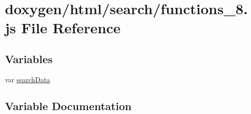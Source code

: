 \hypertarget{a00091}{}\section{doxygen/html/search/functions\+\_\+8.js File Reference}
\label{a00091}
\subsection*{Variables}
\begin{DoxyCompactItemize}
\item 
var \hyperlink{a00091_ad01a7523f103d6242ef9b0451861231e}{search\+Data}
\end{DoxyCompactItemize}


\subsection{Variable Documentation}
\hypertarget{a00091_ad01a7523f103d6242ef9b0451861231e}{}
